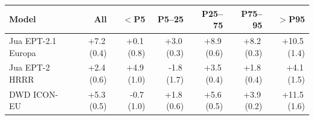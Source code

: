 \begin{tabular}{@{}lrrrrrr@{}}
\toprule
Model & All & $<$P5 & P5--25 & P25--75 & P75--95 & $>$P95 \\
\midrule
Jua EPT-2.1 Europa & +7.2\,(0.4) & +0.1\,(0.8) & +3.0\,(0.3) & +8.9\,(0.6) & +8.2\,(0.3) & +10.5\,(1.4) \\\addlinespace[0.35em]
Jua EPT-2 HRRR & +2.4\,(0.6) & +4.9\,(1.0) & -1.8\,(1.7) & +3.5\,(0.4) & +1.8\,(0.4) & +4.1\,(1.5) \\\addlinespace[0.35em]
DWD ICON-EU & +5.3\,(0.5) & -0.7\,(1.0) & +1.8\,(0.6) & +5.6\,(0.5) & +3.9\,(0.2) & +11.5\,(1.6) \\
\bottomrule
\end{tabular}
